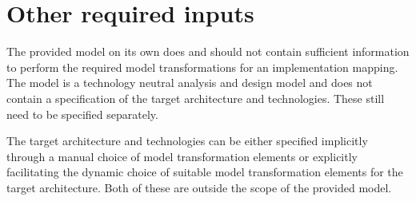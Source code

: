 \section{Other required inputs}

The provided model on its own does and should not contain sufficient information to perform the required
model transformations for an implementation mapping. The model is a technology neutral analysis and
design model and does not contain a specification of the target architecture and technologies. These still
need to be specified separately.

The target architecture and technologies can be either specified implicitly through a manual choice of model
transformation elements or explicitly facilitating the dynamic choice of suitable model transformation elements
for the target architecture. Both of these are outside the scope of the provided model.
